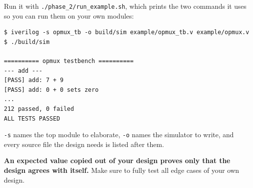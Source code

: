 \documentclass[11pt]{article}
\begin{document}
Run it with \texttt{./phase\_2/run\_example.sh}, which prints the two commands
it uses so you can run them on your own modules:

\begin{lstlisting}[language={}]
$ iverilog -s opmux_tb -o build/sim example/opmux_tb.v example/opmux.v
$ ./build/sim

========== opmux testbench ==========
--- add ---
[PASS] add: 7 + 9
[PASS] add: 0 + 0 sets zero
...
212 passed, 0 failed
ALL TESTS PASSED
\end{lstlisting}

\texttt{-s} names the top module to elaborate, \texttt{-o} names the simulator
to write, and every source file the design needs is listed after them.

\begin{important}
\textbf{An expected value copied out of your design proves only that the
design agrees with itself.} Make sure to fully test all edge cases of your own design.
\end{important}
\end{document}
